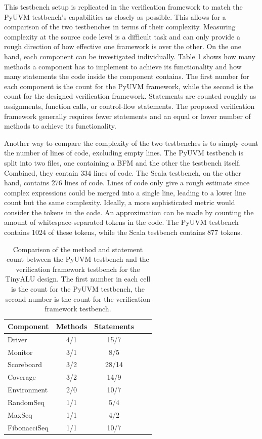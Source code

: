 This testbench setup is replicated in the verification framework to match the PyUVM testbench's capabilities as
closely as possible. This allows for a comparison of the two testbenches in terms of their complexity. Measuring
complexity at the source code level is a difficult task and can only provide a rough direction of how effective one
framework is over the other. On the one hand, each component can be investigated individually. Table
\ref{tab:comparison} shows how many methods a component has to implement to achieve its functionality and how many
statements the code inside the component contains. The first number for each component is the count for the PyUVM
framework, while the second is the count for the designed verification framework. Statements are counted roughly as
assignments, function calls, or control-flow statements. The proposed verification framework generally requires fewer
statements and an equal or lower number of methods to achieve its functionality.

Another way to compare the complexity of the two testbenches is to simply count the number of lines of code,
excluding empty lines. The PyUVM testbench is split into two files, one containing a BFM and the other the
testbench itself. Combined, they contain 334 lines of code. The Scala testbench, on the other hand, contains 276 lines
of code. Lines of code only give a rough estimate since complex expressions could be merged into a single line,
leading to a lower line count but the same complexity. Ideally, a more sophisticated metric would consider the tokens
in the code. An approximation can be made by counting the amount of whitespace-separated tokens in the code. The
PyUVM testbench contains 1024 of these tokens, while the Scala testbench contains 877 tokens.

\begin{table}
  \centering
  \begin{tabular}{|l|c|c|c|c|}
    \hline
    \textbf{Component}       & \textbf{Methods} & \textbf{Statements} \\ \hline
    Driver          & 4/1             & 15/7 \\ \hline
    Monitor         & 3/1             & 8/5    \\ \hline
    Scoreboard       & 3/2            & 28/14    \\ \hline
    Coverage      & 3/2             & 14/9      \\ \hline
    Environment        & 2/0             & 10/7    \\ \hline
    RandomSeq   & 1/1 & 5/4 \\ \hline
    MaxSeq   & 1/1 & 4/2 \\ \hline
    FibonacciSeq   & 1/1 & 10/7 \\ \hline
  \end{tabular}
  \caption{Comparison of the method and statement count between the PyUVM testbench and the verification framework
    testbench for the TinyALU design. The first number in each cell is the count for the PyUVM testbench, the second
  number is the count for the verification framework testbench.}
  \label{tab:comparison}
\end{table}

